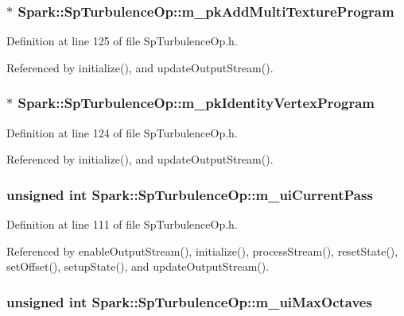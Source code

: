 \subsubsection{$\ast$ {\bf Spark::Sp\-Turbulence\-Op::m\_\-pk\-Add\-Multi\-Texture\-Program}\hspace{0.3cm}{\tt  [protected]}}\label{classSpark_1_1SpTurbulenceOp_p19}


Definition at line 125 of file Sp\-Turbulence\-Op.h.

Referenced by initialize(), and update\-Output\-Stream().
\subsubsection{$\ast$ {\bf Spark::Sp\-Turbulence\-Op::m\_\-pk\-Identity\-Vertex\-Program}\hspace{0.3cm}{\tt  [protected]}}\label{classSpark_1_1SpTurbulenceOp_p18}


Definition at line 124 of file Sp\-Turbulence\-Op.h.

Referenced by initialize(), and update\-Output\-Stream().
\subsubsection{\setlength{\rightskip}{0pt plus 5cm}unsigned int {\bf Spark::Sp\-Turbulence\-Op::m\_\-ui\-Current\-Pass}\hspace{0.3cm}{\tt  [protected]}}\label{classSpark_1_1SpTurbulenceOp_p9}


Definition at line 111 of file Sp\-Turbulence\-Op.h.

Referenced by enable\-Output\-Stream(), initialize(), process\-Stream(), reset\-State(), set\-Offset(), setup\-State(), and update\-Output\-Stream().
\subsubsection{\setlength{\rightskip}{0pt plus 5cm}unsigned int {\bf Spark::Sp\-Turbulence\-Op::m\_\-ui\-Max\-Octaves}\hspace{0.3cm}{\tt  [protected]}}\label{classSpark_1_1SpTurbulenceOp_p10}


